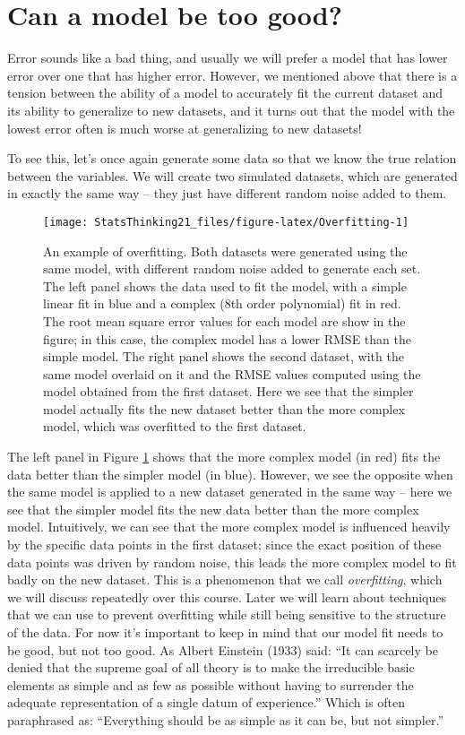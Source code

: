 \documentclass[]{book}
\theoremstyle{definition}
\theoremstyle{definition}
\theoremstyle{definition}
\theoremstyle{remark}
\begin{document}
\section{Can a model be too good?}\label{overfitting}

Error sounds like a bad thing, and usually we will prefer a model that
has lower error over one that has higher error. However, we mentioned
above that there is a tension between the ability of a model to
accurately fit the current dataset and its ability to generalize to new
datasets, and it turns out that the model with the lowest error often is
much worse at generalizing to new datasets!

To see this, let's once again generate some data so that we know the
true relation between the variables. We will create two simulated
datasets, which are generated in exactly the same way -- they just have
different random noise added to them.

\begin{figure}
\texttt{[image: StatsThinking21\_files/figure-latex/Overfitting-1]} \caption{An example of overfitting. Both datasets were generated using the same model, with different random noise added to generate each set.  The left panel shows the data used to fit the model, with a simple linear fit in blue and a complex (8th order polynomial) fit in red.  The root mean square error values for each model are show in the figure; in this case, the complex model has a lower RMSE than the simple model.  The right panel shows the second dataset, with the same model overlaid on it and the RMSE values computed using the model obtained from the first dataset.  Here we see that the simpler model actually fits the new dataset better than the more complex model, which was overfitted to the first dataset.}\label{fig:Overfitting}
\end{figure}

The left panel in Figure \ref{fig:Overfitting} shows that the more
complex model (in red) fits the data better than the simpler model (in
blue). However, we see the opposite when the same model is applied to a
new dataset generated in the same way -- here we see that the simpler
model fits the new data better than the more complex model. Intuitively,
we can see that the more complex model is influenced heavily by the
specific data points in the first dataset; since the exact position of
these data points was driven by random noise, this leads the more
complex model to fit badly on the new dataset. This is a phenomenon that
we call \emph{overfitting}, which we will discuss repeatedly over this
course. Later we will learn about techniques that we can use to prevent
overfitting while still being sensitive to the structure of the data.
For now it's important to keep in mind that our model fit needs to be
good, but not too good. As Albert Einstein (1933) said: ``It can
scarcely be denied that the supreme goal of all theory is to make the
irreducible basic elements as simple and as few as possible without
having to surrender the adequate representation of a single datum of
experience.'' Which is often paraphrased as: ``Everything should be as
simple as it can be, but not simpler.''
\end{document}
